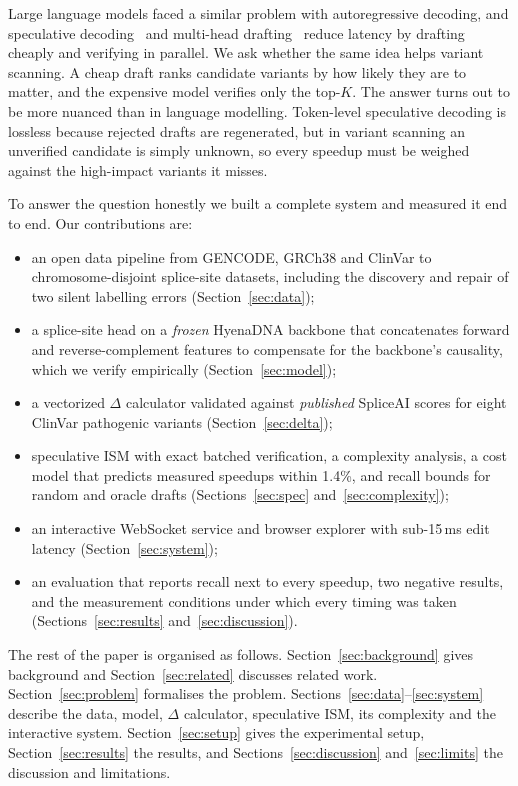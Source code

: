 \documentclass[conference]{IEEEtran}
\begin{document}
Large language models faced a similar problem with autoregressive decoding, and speculative decoding~\cite{leviathan2023speculative,chen2023speculative,stern2018blockwise} and multi-head drafting~\cite{cai2024medusa} reduce latency by drafting cheaply and verifying in parallel. We ask whether the same idea helps variant scanning. A cheap draft ranks candidate variants by how likely they are to matter, and the expensive model verifies only the top-$K$. The answer turns out to be more nuanced than in language modelling. Token-level speculative decoding is lossless because rejected drafts are regenerated, but in variant scanning an unverified candidate is simply unknown, so every speedup must be weighed against the high-impact variants it misses.

To answer the question honestly we built a complete system and measured it end to end. Our contributions are:
\begin{itemize}
  \item an open data pipeline from GENCODE, GRCh38 and ClinVar to chromosome-disjoint splice-site datasets, including the discovery and repair of two silent labelling errors (Section~\ref{sec:data});
  \item a splice-site head on a \emph{frozen} HyenaDNA backbone that concatenates forward and reverse-complement features to compensate for the backbone's causality, which we verify empirically (Section~\ref{sec:model});
  \item a vectorized $\Delta$ calculator validated against \emph{published} SpliceAI scores for eight ClinVar pathogenic variants (Section~\ref{sec:delta});
  \item speculative ISM with exact batched verification, a complexity analysis, a cost model that predicts measured speedups within 1.4\%, and recall bounds for random and oracle drafts (Sections~\ref{sec:spec} and~\ref{sec:complexity});
  \item an interactive WebSocket service and browser explorer with sub-15\,ms edit latency (Section~\ref{sec:system});
  \item an evaluation that reports recall next to every speedup, two negative results, and the measurement conditions under which every timing was taken (Sections~\ref{sec:results} and~\ref{sec:discussion}).
\end{itemize}

The rest of the paper is organised as follows. Section~\ref{sec:background} gives background and Section~\ref{sec:related} discusses related work. Section~\ref{sec:problem} formalises the problem. Sections~\ref{sec:data}--\ref{sec:system} describe the data, model, $\Delta$ calculator, speculative ISM, its complexity and the interactive system. Section~\ref{sec:setup} gives the experimental setup, Section~\ref{sec:results} the results, and Sections~\ref{sec:discussion} and~\ref{sec:limits} the discussion and limitations.
\end{document}
